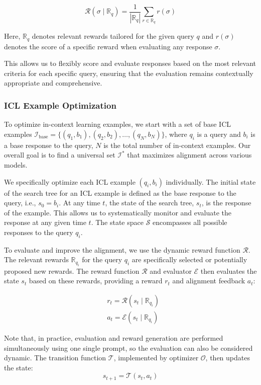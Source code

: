 \[
\mathcal{R}(\sigma \mid \mathbb{R}_q) = \frac{1}{|\mathbb{R}_q|} \sum_{r \in \mathbb{R}_q} r(\sigma)
\]

Here, $\mathbb{R}_q$ denotes relevant rewards tailored for the given query \( q \) and \(r(\sigma)\) denotes the score of a specific reward when evaluating any response \(\sigma\). 

This allows us to flexibly score and evaluate responses based on the most relevant criteria for each specific query, ensuring that the evaluation remains contextually appropriate and comprehensive.




\subsubsection{ICL Example Optimization}

To optimize in-context learning examples, we start with a set of base ICL examples $\mathcal{I}_{\text{base}} = \{(q_1, b_1), (q_2, b_2), \ldots, (q_N, b_N)\} $, where $q_i$ is a query and $b_i$ is a base response to the query, $N$ is the total number of in-context examples. Our overall goal is to find a universal set $\mathcal{I}^{*}$ that maximizes alignment across various models.


We specifically optimize each ICL example $(q_i, b_i)$ individually. The initial state of the search tree for an ICL example is defined as the base response to the query, i.e.,  $s_0 = b_i$. At any time $t$, the state of the search tree, $s_t$, is the response of the example. This allows us to systematically monitor and evaluate the response at any given time $t$. The state space $\mathcal{S}$ encompasses all possible responses to the query $q_i$.


To evaluate and improve the alignment, we use the dynamic reward function $\mathcal{R}$. The relevant rewards $\mathbb{R}_{q_i}$ for the query $q_i$ are specifically selected or potentially proposed new rewards. The reward function $\mathcal{R}$ and evaluator $\mathcal{E}$ then evaluates the state $s_t$ based on these rewards, providing a reward $r_t$ and alignment feedback $a_t$:

\[
\begin{aligned}
& r_t = \mathcal{R}(s_t \mid \mathbb{R}_{q_i}) \\
& a_t = \mathcal{E}(s_t \mid \mathbb{R}_{q_i})
\end{aligned}
\]

Note that, in practice, evaluation and reward generation are performed simultaneously using one single prompt, so the evaluation can also be considered dynamic. The transition function $\mathcal{T}$, implemented by optimizer $\mathcal{O}$, then updates the state:
\[
s_{t+1} = \mathcal{T}(s_t, a_t)
\]

